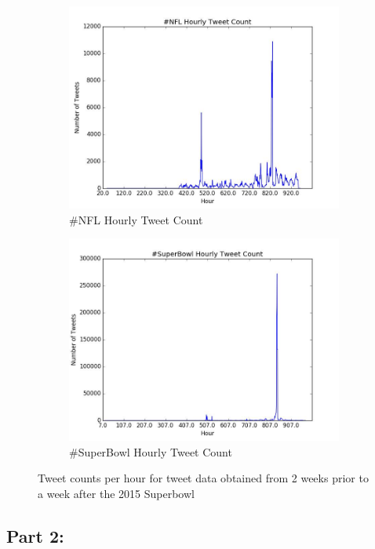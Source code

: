 \documentclass[12pt]{article}
\begin{document}
\begin{figure}
	\centering
	\begin{subfigure}{.45\textwidth}
		\centering
		\includegraphics[width=\textwidth]{figures/1_NFL_histogram.jpeg}
		\centering
		\caption{\#NFL Hourly Tweet Count}
		\label{prob1:fig:1}
	\end{subfigure}%
	\hfill
	\begin{subfigure}{.45\textwidth}
		\centering
		\includegraphics[width=\textwidth]{figures/1_SuperBowl_histogram.jpeg}
		\centering
		\caption{\#SuperBowl Hourly Tweet Count}
		\label{prob1:fig:2}
	\end{subfigure}
	\caption{Tweet counts per hour for tweet data obtained from 2 weeks prior to a week after the 2015 Superbowl}
\end{figure}

\subsection{Part 2:}
\end{document}

